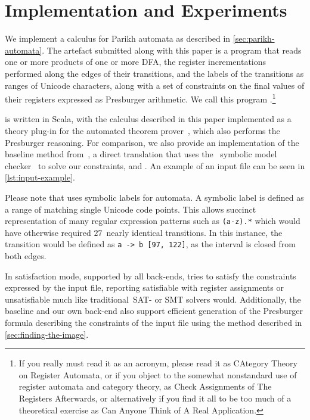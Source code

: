\documentclass[acmsmall,review,anonymous,screen]{acmart}\settopmatter{printfolios=true,printccs=false,printacmref=true}
\theoremstyle{definition}
\newif\ifoutline
\newcommand{\contents}[1]{\ifoutline{\color{blue}
    \begin{itemize}
    #1
    \end{itemize}
  }\fi}
\begin{document}
\contents{\item I have no idea what to write here
\item multiple tracks}

\section{Implementation and Experiments}\label{sec:implementation}

We implement a calculus for Parikh automata as described in
\cref{sec:parikh-automata}. The artefact submitted along with this paper
is a program that reads one or more products of one or more DFA, the register
incrementations performed along the edges of their transitions, and the labels
of the transitions as ranges of Unicode characters, along with a set of
constraints on the final values of their registers expressed as Presburger
arithmetic. We call this program \Catra.\footnote{If you really must read it
as an acronym, please read it as CAtegory Theory on Register Automata, or if you
object to the somewhat nonstandard use of register automata and category theory,
as Check Assignments of The Registers Afterwards, or alternatively if you find it
all to be too much of a theoretical exercise as Can Anyone Think of A Real
Application.}

\Catra{} is written in Scala, with the calculus described in this paper
implemented as a theory plug-in for the \Princess{} automated theorem
prover~\cite{princess}, which also performs the Presburger reasoning. For
comparison, we also provide an implementation of the baseline method
from~\cite{generate-parikh-image}, a direct translation that uses the~\Nuxmv{}
symbolic model checker~\cite{nuxmv} to solve our constraints, and . An example of an input file  can be seen in \cref{lst:input-example}.

Please note that \Catra{} uses symbolic labels for automata. A symbolic label is
defined as a range of matching single Unicode code points. This allows succinct
representation of many regular expression patterns such as \lstinline{(a-z).*}
which would have otherwise required $27$~nearly identical transitions. In this
instance, the transition would be defined as \lstinline{a -> b [97, 122]}, as the
interval is closed from both edges.

In satisfaction mode, supported by all back-ends, \Catra{} tries to satisfy the
constraints expressed by the input file, reporting satisfiable with register
assignments or unsatisfiable much like traditional~SAT- or SMT solvers would.
Additionally, the baseline and our own back-end also support efficient
generation of the Presburger formula describing the constraints of the input
file using the method described in \cref{sec:finding-the-image}.
\end{document}
